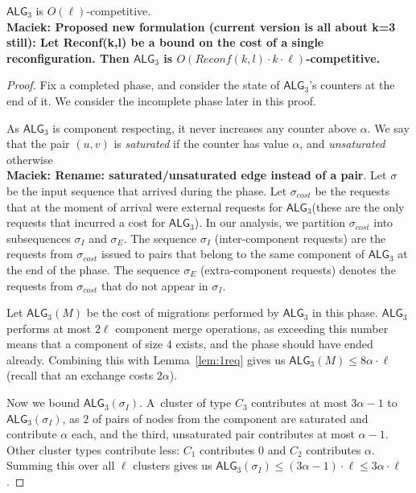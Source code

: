 \documentclass[manuscript,screen=true, review, anonymous]{acmart}
\newcommand{\TAlg}{{\ensuremath{\textsf{ALG}_{3}}}\xspace}
\newcommand\maciek[1]{\color{brown}\textbf{\\ Maciek: #1}\color{black}}
\begin{document}
\begin{theorem}
  \TAlg is $O(\ell)$-competitive.
  \maciek{Proposed new formulation (current version is all about k=3 still): Let Reconf(k,l) be a bound on the cost of a single reconfiguration. Then \TAlg is $O(Reconf(k,l)\cdot k \cdot \ell)$-competitive.}
\end{theorem}
\begin{proof}
  Fix a completed phase, and consider the state of \TAlg's counters at the end of it.
  We consider the incomplete phase later in this proof.

  As \TAlg is component respecting, it never increases any counter above $\alpha$.
  We say that the pair $(u, v)$ is \emph{saturated} if the counter has value $\alpha$, and \emph{unsaturated} otherwise \maciek{Rename: saturated/unsaturated edge instead of a pair}.
  Let $\sigma$ be the input sequence that arrived during the phase.
  Let $\sigma_{cost}$ be the requests that at the moment of arrival were external requests for \TAlg (these are the only requests that incurred a cost for \TAlg).
  In our analysis, we partition $\sigma_{cost}$ into subsequences $\sigma_I$ and $\sigma_E$.
  The sequence $\sigma_I$ (inter-component requests) are the requests from $\sigma_{cost}$ issued to pairs that belong to the same component of \TAlg at the end of the phase.
  The sequence $\sigma_E$ (extra-component requests) denotes the requests from $\sigma_{cost}$ that do not appear in $\sigma_I$.


  Let $\TAlg(M)$ be the cost of migrations performed by \TAlg in this phase.
  \TAlg performs at most $2 \ell$ component merge operations, as
  exceeding this number means that a component of size $4$ exists, and the phase should have ended already.
  Combining this with Lemma~\ref{lem:1req} gives us $\TAlg(M) \leq 8\alpha\cdot\ell$ (recall that an exchange costs $2\alpha$).
  
  Now we bound $\TAlg(\sigma_I)$.
  A~cluster of type $C_3$ contributes at most $3 \alpha - 1$ to $\TAlg(\sigma_I)$, as $2$ of pairs of nodes from the component are saturated and contribute $\alpha$ each, and the third, unsaturated pair contributes at most $\alpha-1$.
  Other cluster types contribute less: $C_1$ contributes $0$ and $C_2$ contributes $\alpha$.
  Summing this over all $\ell$ clusters gives us $\TAlg(\sigma_I) \leq (3 \alpha-1)\cdot \ell \leq 3\alpha\cdot\ell$.


\end{proof}
\end{document}
